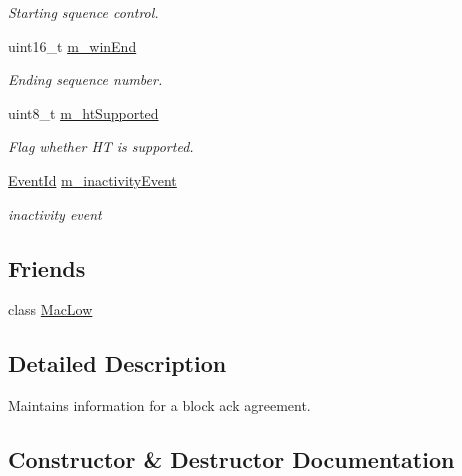 \begin{DoxyCompactItemize}
\begin{DoxyCompactList}\small\item\em Starting squence control. \end{DoxyCompactList}\item 
uint16\+\_\+t \hyperlink{classns3_1_1BlockAckAgreement_a1e215873b2eb273e9fc2beceb1ea4075}{m\+\_\+win\+End}
\begin{DoxyCompactList}\small\item\em Ending sequence number. \end{DoxyCompactList}\item 
uint8\+\_\+t \hyperlink{classns3_1_1BlockAckAgreement_a39fbdfcddd363ac4b0edc69f6af4a688}{m\+\_\+ht\+Supported}
\begin{DoxyCompactList}\small\item\em Flag whether HT is supported. \end{DoxyCompactList}\item 
\hyperlink{classns3_1_1EventId}{Event\+Id} \hyperlink{classns3_1_1BlockAckAgreement_a74bb7967b40a43fad114a73af35dcabc}{m\+\_\+inactivity\+Event}
\begin{DoxyCompactList}\small\item\em inactivity event \end{DoxyCompactList}\end{DoxyCompactItemize}
\subsection*{Friends}
\begin{DoxyCompactItemize}
\item 
class \hyperlink{classns3_1_1BlockAckAgreement_a22001f4f69199d8a64dfd39345b17be2}{Mac\+Low}
\end{DoxyCompactItemize}


\subsection{Detailed Description}
Maintains information for a block ack agreement. 

\subsection{Constructor \& Destructor Documentation}
